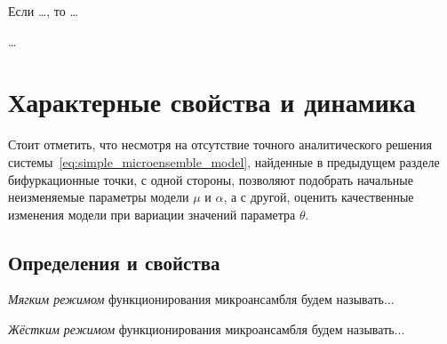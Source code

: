 \begin{Theorem*}
    Если \ldots, то \ldots
\end{Theorem*}
\begin{Proof}
    \ldots
\end{Proof}


\newpage
\section{Характерные свойства и динамика} \label{section:neuron_dynamic}

Стоит отметить, что несмотря на отсутствие точного аналитического решения системы~\eqref{eq:simple_microensemble_model}, найденные в предыдущем разделе бифуркационные точки, с одной стороны, позволяют подобрать начальные неизменяемые параметры модели $\mu$ и $\alpha$, а с другой, оценить качественные изменения модели при вариации значений параметра $\theta$.

\subsection{Определения и свойства}

\begin{Definition}
    \textit{Мягким режимом} функционирования микроансамбля будем называть...
\end{Definition}

\begin{Definition}
    \textit{Жёстким режимом} функционирования микроансамбля будем называть...
\end{Definition}


%
%


